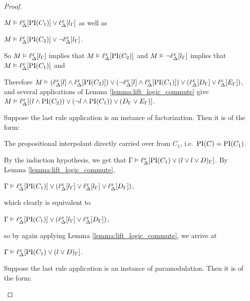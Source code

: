 \begin{proof}
\begin{indproof}
\begin{enumerate}
					$M \entails \lift{\Delta}{ \PI(C_1) }{x} \lor
					\lift{\Delta}{ l_\Gamma }{x}$ as well as

					$M \entails \lift{\Delta}{ \PI(C_2) }{x} \lor
					\lnot \lift{\Delta}{ l_\Gamma }{x}$.

					So $M \entails \lift{\Delta}{ l_\Gamma }{x}$ implies that 
					$M \entails \lift{\Delta}{\PI(C_2)}{x}$ and 
					$M \entails \lnot \lift{\Delta}{ l_\Gamma }{x}$  implies that 
					$M \entails \lift{\Delta}{\PI(C_1)}{x}$ and 

					Therefore
					$M\entails (\lif{l} \land \lif{\PI(C_2)}) \lor (\lnot \lif{l} \land \lif{\PI(C_1)}) \lor (\lif{D_\Gamma} \lor \lif{E_\Gamma}) $,
					and several applications of Lemma \ref{lemma:lift_logic_commute} give
					$M\entails \lif{(l \land \PI(C_2)) \lor (\lnot {l} \land {\PI(C_1)}) \lor ({D_\Gamma} \lor {E_\Gamma})} $.
			\end{enumerate}


		 Suppose the last rule application is an instance of factorization. Then it is of the form:
			\begin{prooftree}
			\end{prooftree}

			The propositional interpolant directly carried over from $C_1$, i.e.~$\PI(C) = \PI(C_1)$.

			By the induction hypothesis, we get that $\Gamma \entails \lif{\PI(C_1) \lor (l \lor l \lor D)_\Gamma}$.
			By Lemma \ref{lemma:lift_logic_commute}, 

			$\Gamma \entails \lif{\PI(C_1)} \lor (\lif{l_\Gamma} \lor  \lif{l_\Gamma} \lor \lif{D_\Gamma})$,

			which clearly is equivalent to

			$\Gamma \entails \lif{\PI(C_1)} \lor (\lif{l_\Gamma} \lor \lif{D_\Gamma})$,

			so by again applying Lemma \ref{lemma:lift_logic_commute}, we arrive at

			$\Gamma \entails \lif{\PI(C_1) \lor (l \lor D)_\Gamma}$.



		 Suppose the last rule application is an instance of paramodulation. Then it is of the form:
			\begin{prooftree}
				\AxiomCm{C_1: D \lor s=t}
				\AxiomCm{C_2: E\occurat{s}{p}}
				\BinaryInfCm{C: D \lor E\occurat{t}{p}}
			\end{prooftree}


\end{indproof}
\end{proof}

